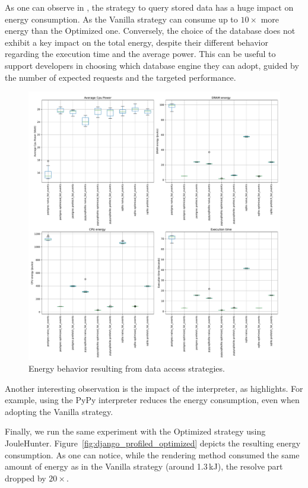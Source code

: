 As one can observe in , the strategy to query stored data has a huge impact on energy consumption.
As the \textsf{Vanilla} strategy can consume up to $10\times$ more energy than the \textsf{Optimized} one.
Conversely, the choice of the database does not exhibit a key impact on the total energy, despite their different behavior regarding the execution time and the average power.
This can be useful to support developers in choosing which database engine they can adopt, guided by the number of expected requests and the targeted performance.

\begin{figure}[!hbt]
    \centering
    \includegraphics[width=\linewidth]{imgs/django}
    \caption{Energy behavior resulting from data access strategies.}
    \label{fig:django}
\end{figure}

Another interesting observation is the impact of the interpreter, as  highlights.
For example, using the \textsf{PyPy} interpreter reduces the energy consumption, even when adopting the \textsf{Vanilla} strategy.

Finally, we run the same experiment with the \textsf{Optimized} strategy using JouleHunter.
Figure~\ref{fig:django_profiled_optimized} depicts the resulting energy consumption.
As one can notice, while the rendering method consumed the same amount of energy as in the \textsf{Vanilla} strategy (around 1.3\,kJ), the resolve part dropped by $20\times$.

